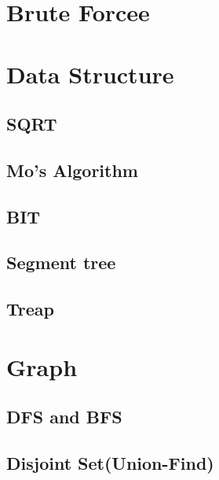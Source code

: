 \section{Brute Forcee}


\section{Data Structure}

\subsection{SQRT}


\subsection{Mo's Algorithm}


\subsection{BIT}


\subsection{Segment tree}


\subsection{Treap}


\section{Graph}

\subsection{DFS and BFS}


\subsection{Disjoint Set(Union-Find)}


